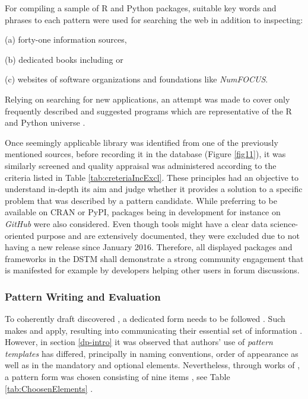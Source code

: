 For compiling a sample of R and Python packages, suitable key words and phrases to each pattern were used for searching the web in addition to inspecting: 
\begin{compactitem}
    \item [(a)] forty-one information sources, 
    \item [(b)] dedicated books including \textcite{Everitt:2006:HSA:1213890} or 
    \item [(c)] websites of software organizations and foundations like \emph{NumFOCUS}.
\end{compactitem}
Relying on  searching for new applications, an attempt was made to cover only frequently described and suggested programs which are representative of the R and Python universe \parencites{Creswell2003}[13]{Pukhovskaya2014}.

Once seemingly applicable library was identified from one of the previously mentioned sources, before recording it in the database (Figure \ref{fig11}), it was similarly screened and quality appraisal was administered according to the criteria listed in Table \ref{tab:creteriaIncExcl}.
These principles had an objective to understand in-depth its aim and judge whether it provides a solution to a specific problem that was described by a pattern candidate.
While preferring to be available on \ac{CRAN} or \ac{PyPI}, packages being in development for instance on \emph{GitHub} were also considered.
Even though tools might have a clear data science-oriented purpose and are extensively documented, they were excluded due to not having a new release since January 2016.
Therefore, all displayed packages and frameworks in the \ac{DSTM} shall demonstrate a strong community engagement that is manifested for example by developers helping other users in forum discussions.

\subsubsection{Pattern Writing and Evaluation} 
\label{patternWritEvalu}
To coherently draft discovered , a dedicated form needs to be followed \parencite[5]{InventadoPeter2015}. 
Such  makes  and apply, resulting into communicating their essential set of information \parencites[16]{GoF2002}{DobleMeszaros1997}. 
However, in section \ref{dp-intro} it was observed that authors' use of \emph{pattern templates} has differed, principally in naming conventions, order of appearance as well as in the mandatory and optional elements. 
Nevertheless, through works of \textcites[1]{AndreseasWellhausenTim2011}{DobleMeszaros1997}{BruseDougals2002}, a pattern form was chosen consisting of nine items , see Table \ref{tab:ChoosenElements} \parencites{Fowler2002}{FowlerBlog2006}.

